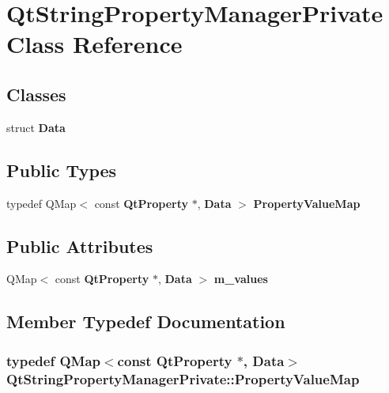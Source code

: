 \section{Qt\+String\+Property\+Manager\+Private Class Reference}
\label{classQtStringPropertyManagerPrivate}
\subsection*{Classes}
\begin{DoxyCompactItemize}
\item 
struct {\bf Data}
\end{DoxyCompactItemize}
\subsection*{Public Types}
\begin{DoxyCompactItemize}
\item 
typedef Q\+Map$<$ const {\bf Qt\+Property} $\ast$, {\bf Data} $>$ {\bf Property\+Value\+Map}
\end{DoxyCompactItemize}
\subsection*{Public Attributes}
\begin{DoxyCompactItemize}
\item 
Q\+Map$<$ const {\bf Qt\+Property} $\ast$, {\bf Data} $>$ {\bf m\+\_\+values}
\end{DoxyCompactItemize}


\subsection{Member Typedef Documentation}
\subsubsection[{Property\+Value\+Map}]{\setlength{\rightskip}{0pt plus 5cm}typedef Q\+Map$<$const {\bf Qt\+Property} $\ast$, {\bf Data}$>$ {\bf Qt\+String\+Property\+Manager\+Private\+::\+Property\+Value\+Map}}\label{classQtStringPropertyManagerPrivate_a3e9a52474ba381e8b7d5b934ac6a72e7}


